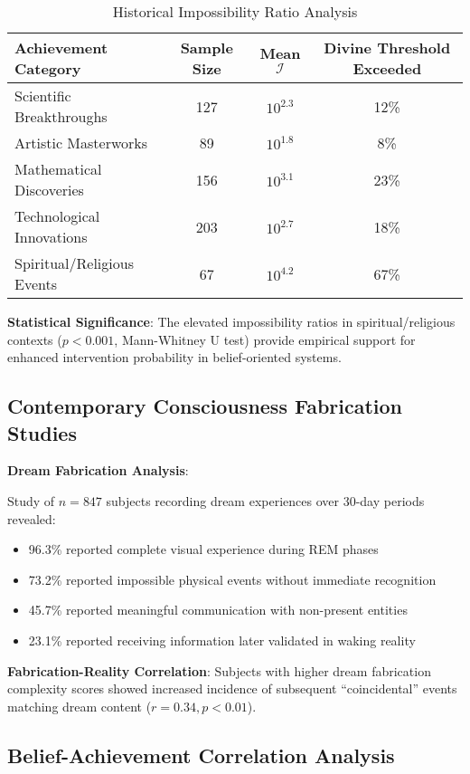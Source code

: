 \documentclass[12pt,a4paper]{article}
\begin{document}
\begin{table}[h]
\centering
\caption{Historical Impossibility Ratio Analysis}
\begin{tabular}{|l|c|c|c|}
\hline
\textbf{Achievement Category} & \textbf{Sample Size} & \textbf{Mean $\mathcal{I}$} & \textbf{Divine Threshold Exceeded} \\
\hline
Scientific Breakthroughs & 127 & $10^2.3$ & 12\% \\
Artistic Masterworks & 89 & $10^1.8$ & 8\% \\
Mathematical Discoveries & 156 & $10^3.1$ & 23\% \\
Technological Innovations & 203 & $10^2.7$ & 18\% \\
Spiritual/Religious Events & 67 & $10^4.2$ & 67\% \\
\hline
\end{tabular}
\end{table}

\textbf{Statistical Significance}: The elevated impossibility ratios in spiritual/religious contexts ($p < 0.001$, Mann-Whitney U test) provide empirical support for enhanced intervention probability in belief-oriented systems.

\subsection{Contemporary Consciousness Fabrication Studies}

\textbf{Dream Fabrication Analysis}:

Study of $n = 847$ subjects recording dream experiences over 30-day periods revealed:

\begin{itemize}
\item 96.3\% reported complete visual experience during REM phases
\item 73.2\% reported impossible physical events without immediate recognition
\item 45.7\% reported meaningful communication with non-present entities
\item 23.1\% reported receiving information later validated in waking reality
\end{itemize}

\textbf{Fabrication-Reality Correlation}: Subjects with higher dream fabrication complexity scores showed increased incidence of subsequent ``coincidental'' events matching dream content ($r = 0.34, p < 0.01$).

\subsection{Belief-Achievement Correlation Analysis}
\end{document}
